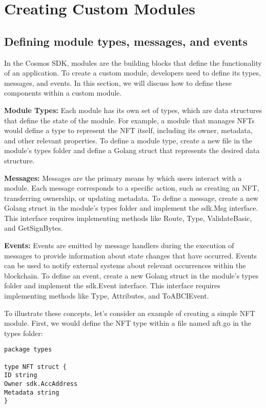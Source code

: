 \documentclass{article}
\begin{document}
%
%
\section{Creating Custom Modules}
%
\subsection{Defining module types, messages, and events}

In the Cosmos SDK, modules are the building blocks that define the functionality of an application. To create a custom module, developers need to define its types, messages, and events. In this section, we will discuss how to define these components within a custom module.

\textbf{Module Types:} Each module has its own set of types, which are data structures that define the state of the module. For example, a module that manages NFTs would define a type to represent the NFT itself, including its owner, metadata, and other relevant properties. To define a module type, create a new file in the module's types folder and define a Golang struct that represents the desired data structure.

\textbf{Messages:} Messages are the primary means by which users interact with a module. Each message corresponds to a specific action, such as creating an NFT, transferring ownership, or updating metadata. To define a message, create a new Golang struct in the module's types folder and implement the sdk.Msg interface. This interface requires implementing methods like Route, Type, ValidateBasic, and GetSignBytes.

\textbf{Events:} Events are emitted by message handlers during the execution of messages to provide information about state changes that have occurred. Events can be used to notify external systems about relevant occurrences within the blockchain. To define an event, create a new Golang struct in the module's types folder and implement the sdk.Event interface. This interface requires implementing methods like Type, Attributes, and ToABCIEvent.

To illustrate these concepts, let's consider an example of creating a simple NFT module. First, we would define the NFT type within a file named nft.go in the types folder:

\begin{lstlisting}[language=Golang]
package types

type NFT struct {
ID string
Owner sdk.AccAddress
Metadata string
}
\end{lstlisting}
\end{document}
